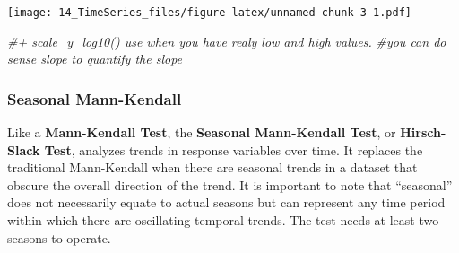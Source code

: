 \documentclass[]{article}
\newenvironment{Shaded}{\begin{snugshade}}{\end{snugshade}}
\newcommand{\KeywordTok}[1]{\textcolor[rgb]{0.13,0.29,0.53}{\textbf{#1}}}
\newcommand{\DataTypeTok}[1]{\textcolor[rgb]{0.13,0.29,0.53}{#1}}
\newcommand{\DecValTok}[1]{\textcolor[rgb]{0.00,0.00,0.81}{#1}}
\newcommand{\StringTok}[1]{\textcolor[rgb]{0.31,0.60,0.02}{#1}}
\newcommand{\CommentTok}[1]{\textcolor[rgb]{0.56,0.35,0.01}{\textit{#1}}}
\newcommand{\OperatorTok}[1]{\textcolor[rgb]{0.81,0.36,0.00}{\textbf{#1}}}
\newcommand{\NormalTok}[1]{#1}
\begin{document}
\begin{Shaded}
\end{Shaded}

\texttt{[image: 14\_TimeSeries\_files/figure-latex/unnamed-chunk-3-1.pdf]}

\begin{Shaded}
\begin{Highlighting}[]
  \CommentTok{#+ scale_y_log10() use when you have realy low and high values.}
\CommentTok{#you can do sense slope to quantify the slope}
\end{Highlighting}
\end{Shaded}

\subsubsection{Seasonal Mann-Kendall}\label{seasonal-mann-kendall}

Like a \textbf{Mann-Kendall Test}, the \textbf{Seasonal Mann-Kendall
Test}, or \textbf{Hirsch-Slack Test}, analyzes trends in response
variables over time. It replaces the traditional Mann-Kendall when there
are seasonal trends in a dataset that obscure the overall direction of
the trend. It is important to note that ``seasonal'' does not
necessarily equate to actual seasons but can represent any time period
within which there are oscillating temporal trends. The test needs at
least two seasons to operate.
\end{document}
